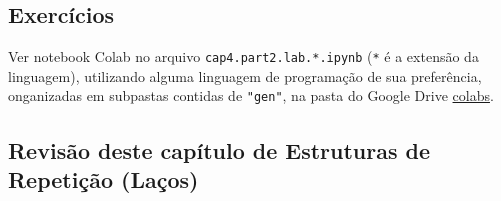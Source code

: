 \documentclass[12pt,a4paper]{article}
\begin{document}
    \hypertarget{exercuxedcios}{%
\subsection{Exercícios}\label{exercuxedcios}}

    Ver notebook Colab no arquivo \texttt{cap4.part2.lab.*.ipynb}
(\texttt{*} é a extensão da linguagem), utilizando alguma linguagem de
programação de sua preferência, onganizadas em subpastas contidas de
\texttt{"gen"}, na pasta do Google Drive
\href{https://drive.google.com/drive/folders/1YlFwv8XYN7PYYf-HwDMlkxzbmXzJw9cM?usp=sharing}{colabs}.

    \hypertarget{revisuxe3o-deste-capuxedtulo-de-estruturas-de-repetiuxe7uxe3o-lauxe7os}{%
\subsection{Revisão deste capítulo de Estruturas de Repetição
(Laços)}\label{revisuxe3o-deste-capuxedtulo-de-estruturas-de-repetiuxe7uxe3o-lauxe7os}}
\end{document}
